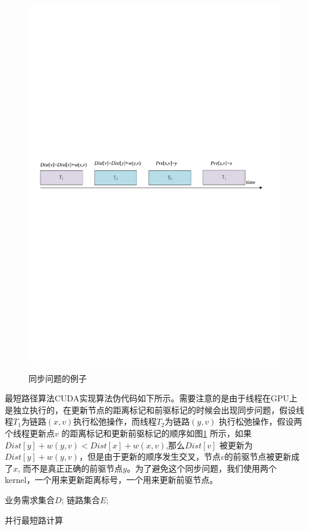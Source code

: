 \begin{figure}
\setlength{\belowcaptionskip}{-0.1cm}
\begin{center}
{\includegraphics[width=0.8 \textwidth]{figures/SynPro.pdf}}
\end{center}
\caption{{\footnotesize{同步问题的例子}}}
\label{SynPro}
\end{figure}
最短路径算法CUDA实现算法伪代码如下所示。需要注意的是由于线程在GPU上是独立执行的，在更新节点的距离标记和前驱标记的时候会出现同步问题，假设线程$T_1$为链路$(x,v)$执行松弛操作，而线程$T_2$为链路$(y,v)$ 执行松弛操作，假设两个线程更新点$v$ 的距离标记和更新前驱标记的顺序如图\ref{SynPro} 所示，如果$Dist[y] + w(y, v) < Dist[x] +w(x, v)$,那么$Dist[v]$ 被更新为$Dist[y] + w(y, v)$，但是由于更新的顺序发生交叉，节点$v$的前驱节点被更新成了$x$, 而不是真正正确的前驱节点$y$。为了避免这个同步问题，我们使用两个kernel，一个用来更新距离标号，一个用来更新前驱节点。
\begin{algorithm}[t]
\begin{algorithmic}[1]
\Require
业务需求集合$D$;
链路集合$E$;
\EndWhile
{}
\end{algorithmic}
\caption{{并行最短路计算}}
\label{ParaSPC}
\end{algorithm}

